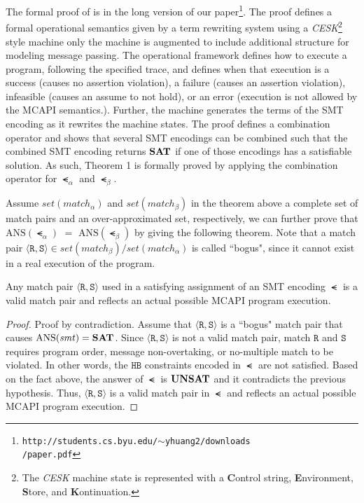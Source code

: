 The formal proof of  is in the long version of our
paper\footnote{\texttt{http://students.cs.byu.edu/$\sim$yhuang2/downloads\\/paper.pdf}}. The
proof defines a formal operational semantics given by a term rewriting
system using a \textit{CESK}\footnote{The \textit{CESK} machine state
  is represented with a \textbf{C}ontrol string, \textbf{E}nvironment,
  \textbf{S}tore, and \textbf{K}ontinuation.} style machine only the
machine is augmented to include additional structure for modeling
message passing. The operational framework defines how to execute a
program, following the specified trace, and defines when that
execution is a success (causes no assertion violation), a failure
(causes an assertion violation), infeasible (causes an assume to not
hold), or an error (execution is not allowed by the MCAPI
semantics.). Further, the machine generates the terms of the SMT
encoding as it rewrites the machine states. The proof defines a
combination operator and shows that several SMT encodings can be
combined such that the combined SMT encoding returns
$\mathrm{\textbf{SAT}}$ if one of those encodings has a satisfiable
solution.  As such, Theorem 1 is formally proved by applying the
combination operator for $\smt_{\alpha}$ and $\smt_{\beta}$.

Assume $\mathit{set(match_{\alpha})}$ and
$\mathit{set(match_{\beta})}$ in the theorem above a complete set of
match pairs and an over-approximated set, respectively, we can further
prove that $\mathrm{ANS}(\smt_{\alpha})$ $ = $
$\mathrm{ANS}(\smt_{\beta})$ by giving the following theorem. Note
that a match pair $\langle \mathtt{R},\mathtt{S}\rangle \in
\mathit{set(match_{\beta})}/\mathit{set(match_{\alpha})}$ is called
``bogus", since it cannot exist in a real execution of the program.

\begin{theorem} \label{thm:two}
Any match pair $\langle \mathtt{R}, \mathtt{S}\rangle$ used in a
satisfying assignment of an SMT encoding $\smt$ is a valid match pair
and reflects an actual possible MCAPI program execution.
\end{theorem}

\begin{proof}
Proof by contradiction. Assume that $\langle \mathtt{R},
\mathtt{S}\rangle$ is a ``bogus" match pair that causes
$\mathrm{ANS}(\mathit{smt}) = \textbf{SAT}$. Since $\langle \mathtt{R},
\mathtt{S}\rangle$ is not a valid match pair, match $\mathtt{R}$ and
$\mathtt{S}$ requires program order, message non-overtaking, or
no-multiple match to be violated. In other words, the $\mathtt{HB}$
constraints encoded in $\smt$ are not satisfied. Based on the fact
above, the answer of $\smt$ is $\textbf{UNSAT}$ and it contradicts the
previous hypothesis. Thus, $\langle \mathtt{R}, \mathtt{S}\rangle$ is
a valid match pair in $\smt$ and reflects an actual possible MCAPI
program execution.
\end{proof}

